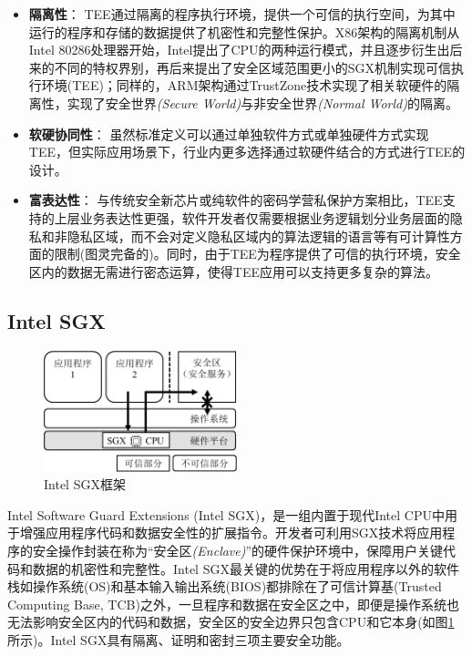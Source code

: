 \begin{itemize}[leftmargin=0em]
    \item \textbf{隔离性}：
          TEE通过隔离的程序执行环境，提供一个可信的执行空间，为其中运行的程序和存储的数据提供了机密性和完整性保护。X86架构的隔离机制从Intel 80286处理器开始，Intel提出了CPU的两种运行模式，并且逐步衍生出后来的不同的特权界别，再后来提出了安全区域范围更小的SGX机制实现可信执行环境(TEE)；同样的，ARM架构通过TrustZone技术实现了相关软硬件的隔离性，实现了安全世界\textit{(Secure World)}与非安全世界\textit{(Normal World)}的隔离。
    \item \textbf{软硬协同性}：
          虽然标准定义可以通过单独软件方式或单独硬件方式实现TEE，但实际应用场景下，行业内更多选择通过软硬件结合的方式进行TEE的设计。
    \item \textbf{富表达性}：
          与传统安全新芯片或纯软件的密码学营私保护方案相比，TEE支持的上层业务表达性更强，软件开发者仅需要根据业务逻辑划分业务层面的隐私和非隐私区域，而不会对定义隐私区域内的算法逻辑的语言等有可计算性方面的限制(图灵完备的)。同时，由于TEE为程序提供了可信的执行环境，安全区内的数据无需进行密态运算，使得TEE应用可以支持更多复杂的算法。
\end{itemize}

\subsection{Intel SGX}
\label{subsec:background-tee-sgx}

\begin{figure}[!htb]
    \small
    \centering
    \includegraphics[width=0.5\textwidth]{pic/background/sgx-example.pdf}
    \caption{Intel SGX框架}
    \label{fig:sgx-arch}
\end{figure}

Intel Software Guard Extensions (Intel SGX)\cite{sgx,sgx2}，是一组内置于现代Intel CPU中用于增强应用程序代码和数据安全性的扩展指令。开发者可利用SGX技术将应用程序的安全操作封装在称为“安全区\textit{(Enclave)}”的硬件保护环境中，保障用户关键代码和数据的机密性和完整性。Intel SGX最关键的优势在于将应用程序以外的软件栈如操作系统(OS)和基本输入输出系统(BIOS)都排除在了可信计算基(Trusted Computing Base, TCB)之外，一旦程序和数据在安全区之中，即便是操作系统也无法影响安全区内的代码和数据，安全区的安全边界只包含CPU和它本身(如图\ref{fig:sgx-arch}所示)。Intel SGX具有隔离、证明和密封三项主要安全功能。

